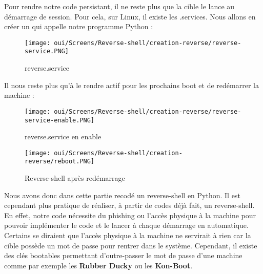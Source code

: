Pour rendre notre code persistant, il ne reste plus que la cible le lance au démarrage de session. Pour cela, sur Linux, il existe les .services. Nous allons en créer un qui appelle notre programme Python :

\begin{figure}[htp!]
  \centering
  \setlength\figureheight{9cm}
  \setlength\figurewidth{7cm}
  \texttt{[image: oui/Screens/Reverse-shell/creation-reverse/reverse-service.PNG]}
  \caption{reverse.service}
  \label{fig:courbe-tikz}
\end{figure}

\newpage
Il nous reste plus qu'à le rendre actif pour les prochains boot et de redémarrer la machine :

\begin{figure}[htp!]
  \centering
  \setlength\figureheight{9cm}
  \setlength\figurewidth{7cm}
  \texttt{[image: oui/Screens/Reverse-shell/creation-reverse/reverse-service-enable.PNG]}
  \caption{reverse.service en enable}
  \label{fig:courbe-tikz}
\end{figure}

\begin{figure}[htp!]
  \centering
  \setlength\figureheight{9cm}
  \setlength\figurewidth{7cm}
  \texttt{[image: oui/Screens/Reverse-shell/creation-reverse/reboot.PNG]}
  \caption{Reverse-shell après redémarrage}
  \label{fig:courbe-tikz}
\end{figure}

Nous avons donc dans cette partie recodé un reverse-shell en Python. Il est cependant plus pratique de réaliser, à partir de codes déjà fait, un reverse-shell. En effet, notre code nécessite du phishing ou l'accès physique à la machine pour pouvoir implémenter le code et le lancer à chaque démarrage en automatique. Certains se diraient que l'accès physique à la machine ne servirait à rien car la cible possède un mot de passe pour rentrer dans le système. Cependant, il existe des clés bootables permettant d'outre-passer le mot de passe d'une machine comme par exemple les \textbf{Rubber Ducky} ou les \textbf{Kon-Boot}.


